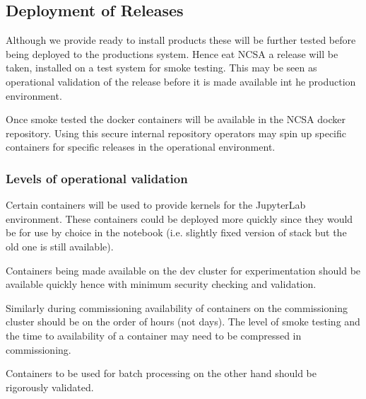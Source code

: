 \subsection{Deployment of Releases}\label{sect:relprep}
Although we provide ready to install products these will be further tested before being deployed to the productions system. Hence eat NCSA a release will be taken, installed on a test system for smoke testing. This may be seen as operational validation of the release before it is made available int he production environment.

Once smoke tested the docker containers will be available in the NCSA docker repository. Using this secure internal repository operators may spin up specific containers for specific releases in the operational environment.

\subsubsection{Levels of operational validation}
Certain containers will be used to provide kernels for the JupyterLab environment. These containers could be
deployed more quickly since they would be for use by choice in the notebook (i.e. slightly fixed version of stack but the old one is still available).

Containers being made available on the dev cluster for experimentation should be available quickly hence with minimum security checking and validation.

Similarly during commissioning  availability of containers on the commissioning cluster should be on the order of hours (not days). The level of smoke testing and the time to availability of a container may need to be compressed in commissioning.

Containers to be used for batch processing on the other hand should be rigorously validated.


